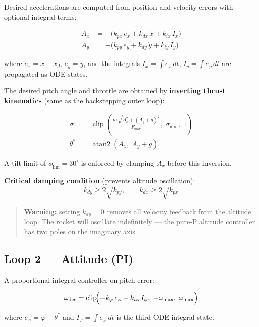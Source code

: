 \documentclass[11pt,a4paper]{article}
\newcommand{\clip}{\operatorname{clip}}
\begin{document}
Desired accelerations are computed from position and velocity errors with optional integral terms:

\begin{align}
  A_x &= -\bigl(k_{px}\,e_x + k_{dx}\,\dot{x} + k_{ix}\,I_x\bigr) \\
  A_y &= -\bigl(k_{py}\,e_y + k_{dy}\,\dot{y} + k_{iy}\,I_y\bigr)
\end{align}

where $e_x = x - x_d$, $e_y = y$, and the integrals $I_x = \int e_x\,dt$, $I_y = \int e_y\,dt$ are propagated as ODE states.

The desired pitch angle and throttle are obtained by \textbf{inverting thrust kinematics} (same as the backstepping outer loop):

\begin{align}
  \sigma &= \clip\!\left(\frac{m\,\sqrt{A_x^2 + (A_y+g)^2}}{F_{\max}},\;\sigma_{\min},\;1\right) \\[4pt]
  \theta^* &= \operatorname{atan2}(A_x,\;A_y + g)
\end{align}

A tilt limit of $\phi_{\lim} = 30^{\circ}$ is enforced by clamping $A_x$ before this inversion.

\textbf{Critical damping condition} (prevents altitude oscillation):
\[
  k_{dy} \geq 2\sqrt{k_{py}}, \qquad k_{dx} \geq 2\sqrt{k_{px}}
\]

\begin{quote}
\textbf{Warning:} setting $k_{dy} = 0$ removes all velocity feedback from the altitude loop. The rocket will oscillate indefinitely --- the pure-P altitude controller has two poles on the imaginary axis.
\end{quote}

\subsection{Loop 2 --- Attitude (PI)}

A proportional-integral controller on pitch error:

\begin{equation}
  \omega_{\mathrm{des}} = \clip\!\Bigl(-k_\varphi\,e_\varphi - k_{i\varphi}\,I_\varphi,\;{-\omega_{\max}},\;\omega_{\max}\Bigr)
\end{equation}

where $e_\varphi = \varphi - \theta^*$ and $I_\varphi = \int e_\varphi\,dt$ is the third ODE integral state.
\end{document}
